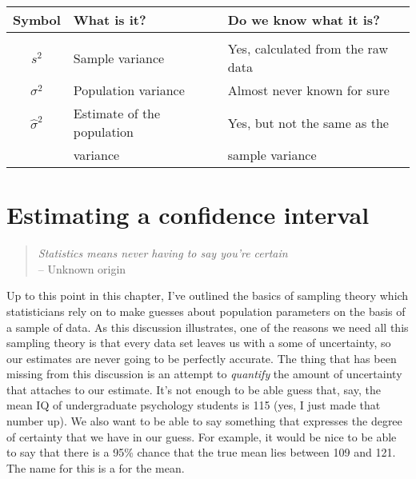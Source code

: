 \begin{center}
\small 
\begin{tabular}{cll}
\hline
Symbol           & What is it?                   & Do we know what it is?            \\
\hline \\[-6pt]
$s^2$            & Sample variance               & Yes, calculated from the raw data \\
$\sigma^2$       & Population variance           & Almost never known for sure       \\
$\hat{\sigma}^2$ & Estimate of the population    & Yes, but not the same as the      \\
~                & variance                      & sample variance                   \\
\hline
\end{tabular}
\end{center}\vspace{0.5cm}


\section{Estimating a confidence interval\label{sec:ci}}

\begin{quote}
{\it Statistics means never having to say you're certain} \\
\hspace*{2cm} -- Unknown origin
\end{quote}

\noindent
Up to this point in this chapter, I've outlined the basics of sampling theory which statisticians rely on to make guesses about population parameters on the basis of a sample of data. As this discussion illustrates, one of the reasons we need all this sampling theory is that every data set leaves us with a some of uncertainty, so our estimates are never going to be perfectly accurate. The thing that has been missing from this discussion is an attempt to {\it quantify} the amount of uncertainty that attaches to our estimate. It's not enough to be able guess that, say, the mean IQ of undergraduate psychology students is 115 (yes, I just made that number up). We also want to be able to say something that expresses the degree of certainty that we have in our guess. For example, it would be nice to be able to say that there is a 95\% chance that the true mean lies between 109 and 121. The name for this is a  for the mean.

